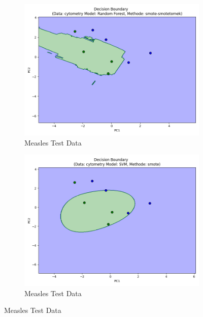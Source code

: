 \documentclass[12pt,a4paper]{report}
\begin{document}
\begin{figure}[h!]
    \vspace{1em}

    \begin{subfigure}[b]{0.49\textwidth}
        \centering
        \includegraphics[width=\textwidth]{images/test_decision_boundary_M.png}
        \caption{Measles Test Data}
        \label{fig:test_decision_boundary_M}
    \end{subfigure}
    \hfill
    \begin{subfigure}[b]{0.49\textwidth}
        \centering
        \includegraphics[width=\linewidth]{images/test2_decision_boundary_M.png}
        \caption{Measles Test Data}
        \label{fig:test2_decision_boundary_M}
    \end{subfigure}


\end{figure}
\end{document}
